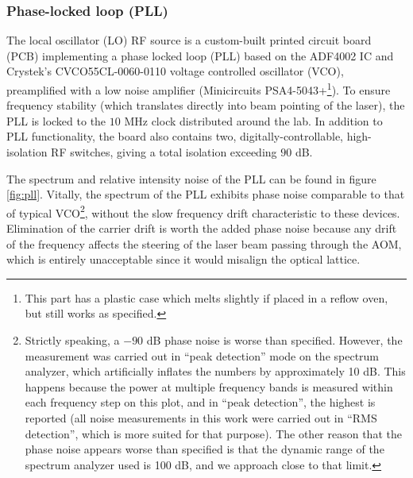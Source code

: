 \documentclass[twocolumn,aps,pra,showpacs,preprintnumbers,bibnotes]{revtex4-1}
\begin{document}
\subsubsection{Phase-locked loop (PLL)}
The local oscillator (LO) RF source is a custom-built printed circuit board (PCB) implementing a phase locked loop (PLL) based on the ADF4002 IC and Crystek's CVCO55CL-0060-0110 voltage controlled oscillator (VCO), preamplified with a low noise amplifier (Minicircuits PSA4-5043+\footnote{This part has a plastic case which melts slightly if placed in a reflow oven, but still works as specified.}). 
To ensure frequency stability (which translates directly into beam pointing of the laser), the PLL is locked to the $10$ MHz clock distributed around the lab.
In addition to PLL functionality, the board also contains two, digitally-controllable, high-isolation RF switches, giving a total isolation exceeding $90$ dB.

The spectrum and relative intensity noise of the PLL can be found in figure \ref{fig:pll}. 
Vitally, the spectrum of the PLL exhibits phase noise comparable to that of typical VCO\footnote{Strictly speaking, a $-90$ dB phase noise is worse than specified. 
However, the measurement was carried out in ``peak detection'' mode on the spectrum analyzer, which artificially inflates the numbers by approximately 10 dB. 
This happens because the power at multiple frequency bands is measured within each frequency step on this plot, and in ``peak detection'', the highest is reported (all noise measurements in this work were carried out in ``RMS detection'', which is more suited for that purpose). The other reason that the phase noise appears worse than specified is that the dynamic range of the spectrum analyzer used is 100 dB, and we approach close to that limit.}, without the slow frequency drift characteristic to these devices.
Elimination of the carrier drift is worth the added phase noise because any drift of the frequency affects the steering of the laser beam passing through the AOM, which is entirely unacceptable since it would misalign the optical lattice.
\end{document}
